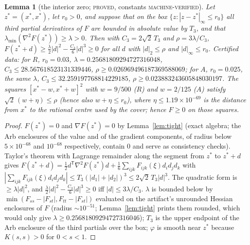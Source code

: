 \documentclass[11pt]{article}
\theoremstyle{plain}
\newtheorem{lemma}[theorem]{Lemma}
\theoremstyle{definition}
\theoremstyle{remark}
\newcommand{\lbl}[1]{\textsc{#1}}
\begin{document}
\begin{lemma}[the interior zero; \lbl{proved}, constants \lbl{machine-verified}]\label{lem:local}
Let $z^\ast=(x^\ast,x^\ast)$, let $r_0>0$, and suppose that on the box
$\{z:|z-z^\ast|_\infty\le r_0\}$ all third partial derivatives of $F$ are
bounded in absolute value by $T_3$, and that $\lambda_{\min}(\nabla^2F(z^\ast))\ge\lambda>0$.
Then with $C_3=2\sqrt2\,T_3$ and $\rho=3\lambda/C_3$,
$F(z^\ast+d)\ge\tfrac\lambda2|d|^2-\tfrac{C_3}6|d|^3\ge0$ for all $d$ with
$|d|_2\le\rho$ and $|d|_\infty\le r_0$.  Certified data: for $R$,
$r_0=0.03$, $\lambda=0.25681809294727316048$, $C_3\le28.567618523131339446$,
$\rho\ge0.026969496187369588069$; for $A$, $r_0=0.025$, the same $\lambda$,
$C_3\le32.259197768814229185$, $\rho\ge0.023883243605848030197$.  The squares
$[x^\ast-w,x^\ast+w]^2$ with $w=9/500$ ($R$) and $w=2/125$ ($A$) satisfy
$\sqrt2\,(w+\eta)\le\rho$ (hence also $w+\eta\le r_0$), where
$\eta\le1.19\times10^{-69}$ is the distance from $x^\ast$ to the rational
centre used by the cover; hence $F\ge0$ on those squares.
\end{lemma}
\begin{proof}
$F(z^\ast)=0$ and $\nabla F(z^\ast)=0$ by Lemma~\ref{lem:tight} (exact algebra;
the Arb enclosures of the value and of the gradient components, of radius
below $5\times10^{-68}$ and $10^{-68}$ respectively, contain $0$ and serve as
consistency checks).  Taylor's theorem with Lagrange remainder along the
segment from $z^\ast$ to $z^\ast+d$ gives
$F(z^\ast+d)=\tfrac12d^{\mathsf T}\nabla^2F(z^\ast)d+\tfrac16\sum_{ijk}F_{ijk}(\xi)d_id_jd_k$
with $|\sum_{ijk}F_{ijk}(\xi)d_id_jd_k|\le T_3(|d_1|+|d_2|)^3\le2\sqrt2\,T_3|d|^3$.
The quadratic form is $\ge\lambda|d|^2$, and
$\tfrac\lambda2|d|^2-\tfrac{C_3}6|d|^3\ge0$ iff $|d|\le3\lambda/C_3$.
$\lambda$ is bounded below by $\min(F_{ss}-|F_{st}|,F_{tt}-|F_{st}|)$ evaluated
on the artifact's unrounded Hessian enclosures of $F$ (radius $\sim10^{-51}$;
Lemma~\ref{lem:tight} prints them rounded, which would only give
$\lambda\ge0.25681809294727316046$); $T_3$ is the upper endpoint of the Arb
enclosure of the third partials over the box; $\varphi$ is smooth near
$z^\ast$ because $K(s,s)>0$ for $0<s<1$.
\end{proof}
\end{document}
